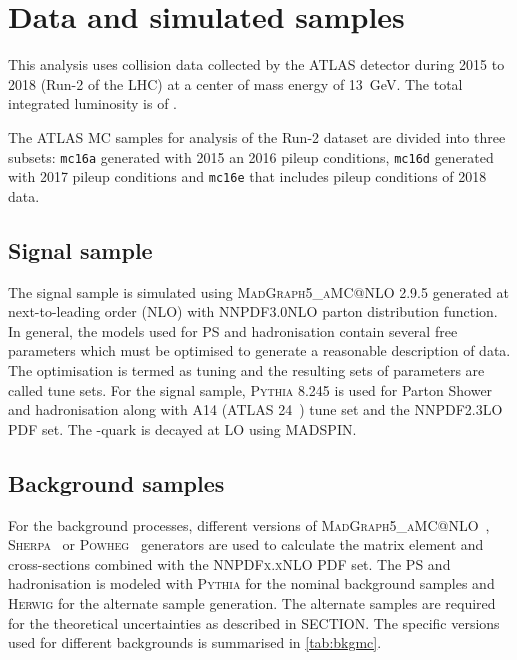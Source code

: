 \section{Data and simulated samples}
This analysis uses collision data collected by the ATLAS detector during 2015 to 2018 (Run-2 of the LHC) at a center of
mass energy of \qty{13}{\GeV}. The total integrated luminosity is of \lumi.

The ATLAS MC samples for analysis of the Run-2 dataset are divided into three subsets: 
\texttt{mc16a} generated with 2015 an 2016 pileup conditions, \texttt{mc16d} generated with 
2017 pileup conditions and \texttt{mc16e} that includes pileup conditions of 2018 data. 

\subsection{Signal sample}
The \tZq signal sample is simulated using \textsc{MadGraph5\_aMC@NLO} 2.9.5 generated at next-to-leading
order (NLO) with \textsc{NNPDF3.0NLO} parton distribution function. In general, the models used for
PS and hadronisation contain several free parameters which must be optimised to generate a reasonable
description of data. The optimisation is termed as tuning and the resulting sets of parameters are called
tune sets. For the signal sample, \textsc{Pythia} 8.245 is used for Parton Shower and
hadronisation along with A14 (ATLAS 24~\cite{ATL-PHYS-PUB-2014-021}) tune set and the \textsc{NNPDF2.3LO} PDF set.
The \Ptop-quark is decayed at LO using \textsc{MADSPIN}.

\subsection{Background samples}
For the background processes, different versions of \textsc{MadGraph5\_aMC@NLO}~\cite{Alwall:2014hca}, 
\textsc{Sherpa}~\cite{TGleisberg_2009} or \textsc{Powheg}~\cite{Banfi:2023mhz} generators are used to
calculate the matrix element and cross-sections combined with the \textsc{NNPDFx.xNLO} PDF set.
The PS and hadronisation is modeled with \textsc{Pythia} for the nominal background samples
and \textsc{Herwig} for the alternate sample generation. The alternate samples are required
for the theoretical uncertainties as described in SECTION. The specific versions
used for different backgrounds is summarised in \cref{tab:bkgmc}.


